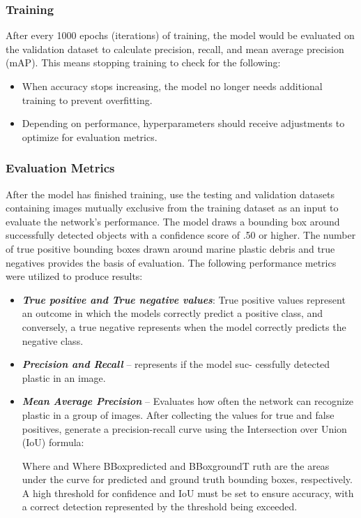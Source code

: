 \documentclass[a4paper,fleqn]{cas-dc}
\begin{document}
\begin{enumerate}[label={\alph*})]
\subsubsection{Training}
After every 1000 epochs (iterations) of training, the model would be evaluated on the validation dataset to calculate precision, recall, and mean average precision (mAP). This means stopping training to check for the following:

\begin{itemize}
\item When accuracy stops increasing, the model no longer needs additional training to prevent overfitting.
\item Depending on performance, hyperparameters should receive adjustments to optimize for evaluation metrics.
\end{itemize}

\subsubsection{Evaluation Metrics}
After the model has finished training, use the testing and validation datasets containing images mutually exclusive from the training dataset as an input to evaluate the network’s performance.
The model draws a bounding box around successfully detected objects with a confidence score of .50 or higher. The number of true positive bounding boxes drawn around marine plastic debris and true negatives provides the basis of evaluation. The following performance metrics were utilized to produce results:


\begin{itemize}
\item \textit {\textbf{True positive and True negative values}}: True positive values represent an outcome in which the models correctly predict a positive class, and conversely, a true negative represents when the model correctly predicts the negative class.

\item \textit{\textbf{Precision and Recall}} -- represents if the model suc- cessfully detected plastic in an image.


\item \textit{\textbf{Mean Average Precision}} -- Evaluates how often the network can recognize plastic in a group of images. After collecting the values for true and false positives, generate a precision-recall curve using the Intersection over Union (IoU) formula:

Where 
and 
Where BBoxpredicted and BBoxgroundT ruth are the areas under the curve for predicted and ground truth bounding boxes, respectively. A high threshold for confidence and IoU must be set to ensure accuracy, with a correct detection represented by the threshold being exceeded.


\end{itemize}
\end{enumerate}
\end{document}
